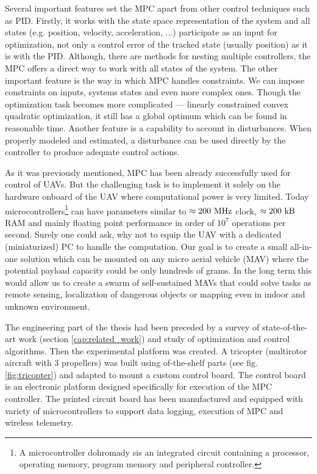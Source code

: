 Several important features set the MPC apart from other control techniques such as PID. Firstly, it works with the state space representation of the system and all states (e.g. position, velocity, acceleration, ...) participate as an input for optimization, not only a control error of the tracked state (usually position) as it is with the PID. Although, there are methods for nesting multiple controllers, the MPC offers a direct way to work with all states of the system. The other important feature is the way in which MPC handles constraints. We can impose constraints on inputs, systems states and even more complex ones. Though the optimization task becomes more complicated --- linearly constrained convex quadratic optimization, it still has a global optimum which can be found in reasonable time. Another feature is a capability to account in disturbances. When properly modeled and estimated, a disturbance can be used directly by the controller to produce adequate control actions.

As it was previously mentioned, MPC has been already successfully used for control of UAVs. But the challenging task is to implement it solely on the hardware onboard of the UAV where computational power is very limited. Today microcontrollers\footnote{A microcontroller dohromady sis an integrated circuit containing a processor, operating memory, program memory and peripheral controller.} can have parameters similar to $\approx 200 ~\mathrm{MHz}$ clock, $\approx 200 ~\mathrm{kB}$ RAM and mainly floating point performance in order of $10^7$ operations per second. Surely one could ask, why not to equip the UAV with a dedicated (miniaturized) PC to handle the computation. Our goal is to create a small all-in-one solution which can be mounted on any micro aerial vehicle (MAV) where the potential payload capacity could be only hundreds of grams. In the long term this would allow us to create a swarm of self-sustained MAVs that could solve tasks as remote sensing, localization of dangerous objects or mapping even in indoor and unknown environment.

The engineering part of the thesis had been preceded by a survey of state-of-the-art work (section \ref{cap:related_work}) and study of optimization and control algorithms. Then the experimental platform was created. A tricopter (multirotor aircraft with 3 propellers) was built using of-the-shelf parts (see fig. \ref{fig:tricopter}) and adapted to mount a custom control board. The control board is an electronic platform designed specifically for execution of the MPC controller. The printed circuit board has been manufactured and equipped with variety of microcontrollers to support data logging, execution of MPC and wireless telemetry. 

